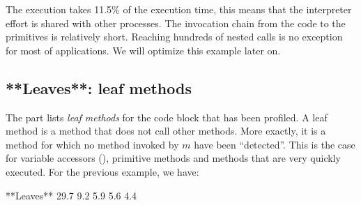 \documentclass[a4paper,10pt,twoside]{book}
\begin{document}

The execution takes 11.5\% of the execution time, this means that the interpreter effort is shared with other processes. The invocation chain from the code to the primitives is relatively short. Reaching hundreds of nested calls is no exception for most of applications. We will optimize this example later on.


\subsection{**Leaves**: leaf methods}

The  part lists \emph{leaf methods} for the code block that has been profiled. A leaf method is a method that does not call other methods. More exactly, it is a method  for which no method invoked by $m$ have been ``detected''. This is the case for variable accessors (\eg  {}), primitive methods and methods that are very quickly executed. For the previous example, we have:


\begin{code}

**Leaves**
29.7%
9.2%
5.9%
5.6%
4.4%
\end{code}
\end{document}
